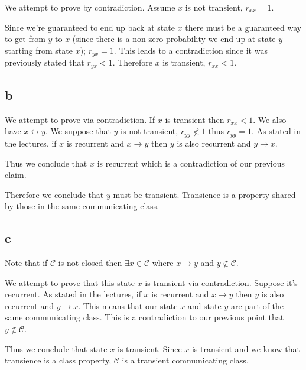 \documentclass{article}
\begin{document}
We attempt to prove by contradiction. Assume $x$ is not transient, $r_{xx} = 1$.

Since we're guaranteed to end up back at state $x$ there must be a guaranteed
way to get from $y$ to $x$ (since there is a non-zero probability we end up at
state $y$ starting from state $x$); $r_{yx} = 1$.
This leads to a contradiction since it was previously stated
that $r_{yx} < 1$. Therefore $x$ is transient, $r_{xx} < 1$.

\subsection{b}
We attempt to prove via contradiction.
If $x$ is transient then $r_{xx} < 1$. We also have $x \leftrightarrow y$.
We suppose that $y$ is not transient, $r_{yy} \nless 1$ thus $r_{yy} = 1$.
As stated in the lectures,
if $x$ is recurrent and $x \to y$ then $y$ is also recurrent and $y \to x$.

Thus we conclude that $x$ is recurrent which is a contradiction of our previous
claim.

Therefore we conclude that $y$ must be transient. Transience is a property
shared by those in the same communicating class.

\subsection{c}
Note that if $\mathcal{C}$ is not closed then $\exists x \in \mathcal{C}$
where $x \to y$ and $y \notin \mathcal{C}$.

We attempt to prove that this state $x$ is transient via contradiction.
Suppose it's recurrent. As stated in the lectures,
if $x$ is recurrent and $x \to y$ then $y$ is also recurrent and $y \to x$.
This means that our state $x$ and state $y$ are part of the same communicating
class. This is a contradiction to our previous point that
$y \notin \mathcal{C}$.

Thus we conclude that state $x$ is transient. Since $x$ is transient and we know
that transience is a class property, $\mathcal{C}$ is a transient communicating
class.
\end{document}
